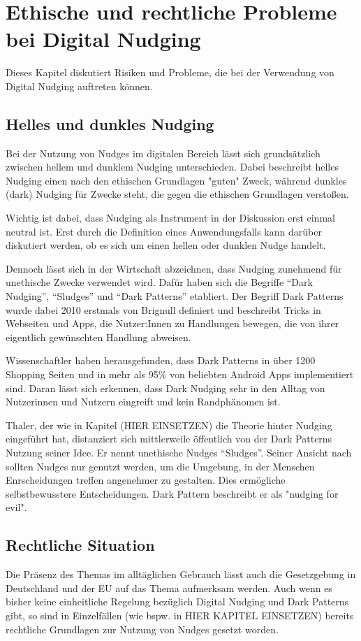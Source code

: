 \chapter{Ethische und rechtliche Probleme bei Digital Nudging}
Dieses Kapitel diskutiert Risiken und Probleme, die bei der Verwendung von Digital Nudging auftreten können.
\section{Helles und dunkles Nudging}
Bei der Nutzung von Nudges im digitalen Bereich lässt sich grundsätzlich zwischen hellem und dunklem Nudging unterschieden. Dabei beschreibt helles Nudging einen nach den ethischen Grundlagen "guten" Zweck, während dunkles (dark) Nudging für Zwecke steht, die gegen die ethischen Grundlagen verstoßen.

Wichtig ist dabei, dass Nudging als Instrument in der Diskussion erst einmal neutral ist. Erst durch die Definition eines Anwendungsfalls kann darüber diskutiert werden, ob es sich um einen hellen oder dunklen Nudge handelt.

Dennoch lässt sich in der Wirtschaft abzeichnen, dass Nudging zunehmend für unethische Zwecke verwendet wird. Dafür haben sich die Begriffe ``Dark Nudging'', ``Sludges'' und ``Dark Patterns'' etabliert.  Der Begriff Dark Patterns wurde dabei 2010 erstmals von  Brignull definiert und beschreibt Tricks in Webseiten und Apps, die Nutzer:Innen zu Handlungen bewegen, die von ihrer eigentlich gewünschten Handlung abweisen. 

Wissenschaftler haben herausgefunden, dass Dark Patterns in über 1200 Shopping Seiten  und in mehr als 95\% von beliebten Android Apps  implementiert sind. Daran lässt sich erkennen, dass Dark Nudging sehr in den Alltag von Nutzerinnen und Nutzern eingreift und kein Randphänomen ist.

Thaler, der wie in Kapitel (HIER EINSETZEN) die Theorie hinter Nudging eingeführt hat, distanziert sich mittlerweile öffentlich von der Dark Patterns Nutzung seiner Idee. Er nennt unethische Nudges ``Sludges''. Seiner Ansicht nach sollten Nudges nur genutzt werden, um die Umgebung, in der Menschen Enrscheidungen treffen angenehmer zu gestalten. Dies ermögliche selbstbewusstere Entscheidungen. Dark Pattern beschreibt er als "nudging for evil". 

\section{Rechtliche Situation}
Die Präsenz des Themas im alltäglichen Gebrauch lässt auch die Gesetzgebung in Deutschland und der \ac{EU} auf das Thema aufmerksam werden. Auch wenn es bisher keine einheitliche Regelung bezüglich Digital Nudging und Dark Patterns gibt, so sind in Einzelfällen (wie bspw. in HIER KAPITEL EINSETZEN) bereits rechtliche Grundlagen zur Nutzung von Nudges gesetzt worden.

